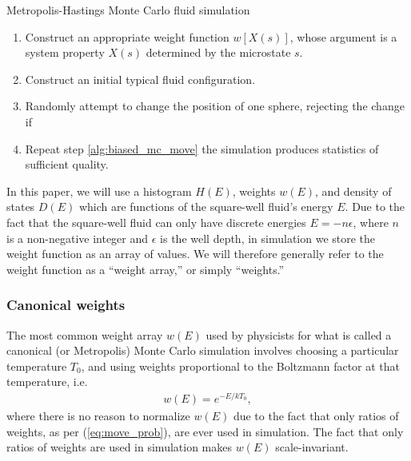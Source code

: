 \documentclass[11pt]{article}
\newcommand{\p}[1]{\left(#1\right)} %
\renewcommand{\sp}[1]{\left[#1\right]} %
\newenvironment{alg}
{\hrulefill\begin{enumerate}}
{\end{enumerate}\hrulefill}
\begin{document}
\begin{algorithm}[tb]
  \caption{Metropolis-Hastings Monte Carlo fluid simulation}
  \label{alg:biased_MC}
  \begin{alg}

  \item Construct an appropriate weight function $w\sp{X\p{s}}$, whose
    argument is a system property $X\p{s}$ determined by the
    microstate $s$.

  \item Construct an initial typical fluid configuration.

  \item Randomly attempt to change the position of one sphere,
    rejecting the change if
    \label{alg:biased_mc_move}

  \item Repeat step \ref{alg:biased_mc_move} the simulation produces
    statistics of sufficient quality.

  \end{alg}
\end{algorithm}

In this paper, we will use a histogram $H\p{E}$, weights $w\p{E}$, and
density of states $D\p{E}$ which are functions of the square-well
fluid's energy $E$. Due to the fact that the square-well fluid can
only have discrete energies $E=-n\epsilon$, where $n$ is a
non-negative integer and $\epsilon$ is the well depth, in simulation
we store the weight function as an array of values. We will therefore
generally refer to the weight function as a ``weight array,'' or
simply ``weights.''

\subsubsection{Canonical weights}
\label{sec:canonical_weights}

The most common weight array $w\p{E}$ used by physicists for what is
called a canonical (or Metropolis) Monte Carlo simulation involves
choosing a particular temperature $T_0$, and using weights
proportional to the Boltzmann factor at that temperature, i.e.
\begin{align}
  w\p{E}=e^{-E/kT_0},
\end{align}
where there is no reason to normalize $w\p{E}$ due to the fact that
only ratios of weights, as per (\ref{eq:move_prob}), are ever used in
simulation. The fact that only ratios of weights are used in
simulation makes $w\p{E}$ scale-invariant.
\end{document}
